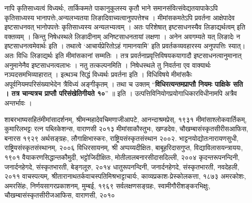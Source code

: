 नापि कृतिसाध्यत्वं विध्यर्थः, तार्किकमते पाकानुकूलस्य कृतौ भाने समानसंवित्संवेद्यतयापाकेऽपि कृतिसाध्यस्य भानापत्तेः,अन्यलभ्यतया लिङादिवाच्यत्वानुपपत्तेश्च । मीमांसकमतेऽपि प्रवर्तना आक्षेपादेव इष्टसाधनवत् भानोपपत्तेः कृतिसाध्यस्य अन्यलभ्यत्वम् । अतः परिशेषात्  इष्टसाधनस्यैव लिङाद्यर्थत्वम् इति वक्तव्यम् । किन्तु निषेधस्थले लिङादीनाम् अनिष्टसाधनतायां लक्षणा । अनेन अवगम्यते यत् लिङादेः न इष्टसाधनत्वमेवार्थः इति । तथात्वे ‘आचार्यप्रेरितोऽहं गामानयामि’ इति प्रवर्तकव्यवहारस्य अनुपपत्तिः स्यात्। अतः विधिः लिङाद्यर्थः इति मीमांसकानां सम्मतिः । तत्र प्रवर्तनाप्रवृत्तिविषयकयागादौ इष्टसाधनत्वानुमानात् अनुमानेनैव इष्टसाधनत्वलाभः । नतु तत्कल्पनमिति । निषेधस्थले तु निवर्तना एव वाक्यार्थः नञ्पदसमभिव्याहारात् । इत्थञ्च सिद्धं विध्यर्थः प्रवर्तना इति ।  विधिविषये मीमांसकैः अपूर्वनियमपरिसंख्याभेदेन त्रैविध्यं अङ्गीकृतम् । तथा च उक्तम् “\textbf{विधिरत्यन्तमप्राप्तौ नियमः पाक्षिके सति । तत्र चान्यत्रच प्राप्तौ परिसंखेतिगीयते १०}” ॥ इति । उत्पत्तिविनियोगप्रयोगाधिकारविधीनामपि अत्रैव अन्तर्भावः । 

\begin{thebibliography}{99}
 शाबरभाष्यसहितंमीमांसादर्शनम्, श्रीमन्महादेवचिमणाजीआपटे, आनन्दाश्रमप्रेस्, १९३१
 मीमांसाश्लोकवार्तिकम्, कुमारिलभट्टः रत्न पब्लिकेशन्स, वाराणसी २०१३
 मीमांसाकौस्तुभः, खण्डदेवः, चौखम्बासंस्कृतसीरीसआफिस, बनारस १९२९
 अर्थसङ्ग्रहः, लौगाक्षिभास्करः, राष्ट्रियसंस्कृतसंस्थान २००२.
 भाट्टनयोद्योतःनारायणसुधी, राष्ट्रियसंस्कृतसंस्थानम्, २००६
 विधिरसायनम्, श्री अप्पय्यदीक्षितः, बाबूहरिदासगुप्त, विद्याविलासयन्त्राययः, १९०१
 वैयाकरणसिद्धान्तकौमुदी, भट्टोजिदीक्षितः, मोतीलालबनारसीदासदिल्ली, २००४
 कृदन्तरूपनन्दिनी, जनार्दनहेगदे, संस्कृतभारती, बेङ्गलूरु, २०१४
 धातुरूपनन्दिनी, जनार्दनहेगदे, संस्कृतभारती, नवदेहली, २०११
 वाचस्पत्यम्, श्रीतारानाथतर्कवाचस्पतिमिश्रभाट्टाचार्यः, काव्यप्रकाश-प्रेस्कोलकत्ता, १८७३
 अमरकोशः, अमरसिंहः, निर्णयसागरप्रकाशनम्, मुम्बई, १९६९
 सर्वलक्षणसङ्ग्रहः, स्वामीगौरीशङ्करभिक्षुः, चौखम्बासंस्कृतसीरीजआफिस, वाराणसी, २०१०
  
  
\end{thebibliography}

